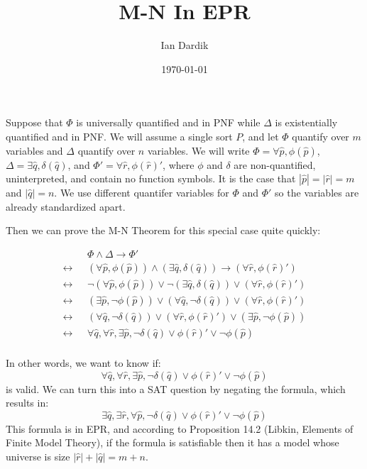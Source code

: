 \documentclass[12pt]{article}
\title{M-N In EPR}
\author{Ian Dardik}
\date{\today}
\theoremstyle{definition}
\theoremstyle{remark}
\newcommand{\msp}{\text{ }}
\begin{document}
\maketitle

Suppose that $\Phi$ is universally quantified and in PNF while $\Delta$ is existentially quantified and in PNF.  We will assume a single sort $P$, and let $\Phi$ quantify over $m$ variables and $\Delta$ quantify over $n$ variables.  We will write $\Phi = \forall \hat{p}, \phi(\hat{p})$, $\Delta = \exists \hat{q}, \delta(\hat{q})$, and $\Phi' = \forall \hat{r}, \phi(\hat{r})'$, where $\phi$ and $\delta$ are non-quantified, uninterpreted, and contain no function symbols.  It is the case that $|\hat{p}| = |\hat{r}| = m$ and $|\hat{q}| = n$.  We use different quantifer variables for $\Phi$ and $\Phi'$ so the variables are already standardized apart.

Then we can prove the M-N Theorem for this special case quite quickly:

\begin{align*}
  & \msp \Phi \land \Delta \rightarrow \Phi'\\
  \leftrightarrow & \msp (\forall \hat{p}, \phi(\hat{p})) \land (\exists \hat{q}, \delta(\hat{q})) \rightarrow (\forall \hat{r}, \phi(\hat{r})')\\
  \leftrightarrow & \msp \neg(\forall \hat{p}, \phi(\hat{p})) \lor \neg(\exists \hat{q}, \delta(\hat{q})) \lor (\forall \hat{r}, \phi(\hat{r})')\\
  \leftrightarrow & \msp (\exists \hat{p}, \neg\phi(\hat{p})) \lor (\forall \hat{q}, \neg\delta(\hat{q})) \lor (\forall \hat{r}, \phi(\hat{r})')\\
  \leftrightarrow & \msp (\forall \hat{q}, \neg\delta(\hat{q})) \lor (\forall \hat{r}, \phi(\hat{r})') \lor (\exists \hat{p}, \neg\phi(\hat{p}))\\
  \leftrightarrow & \msp \forall \hat{q}, \forall \hat{r}, \exists \hat{p}, \neg\delta(\hat{q}) \lor \phi(\hat{r})' \lor \neg\phi(\hat{p})\\
\end{align*}

In other words, we want to know if:
$$\forall \hat{q}, \forall \hat{r}, \exists \hat{p}, \neg\delta(\hat{q}) \lor \phi(\hat{r})' \lor \neg\phi(\hat{p})$$
is valid.  We can turn this into a SAT question by negating the formula, which results in:
$$\exists \hat{q}, \exists \hat{r}, \forall \hat{p}, \neg\delta(\hat{q}) \lor \phi(\hat{r})' \lor \neg\phi(\hat{p})$$
This formula is in EPR, and according to Proposition 14.2 (Libkin, Elements of Finite Model Theory), if the formula is satisfiable then it has a model whose universe is size $|\hat{r}| + |\hat{q}| = m + n$.

%
%
\end{document}
